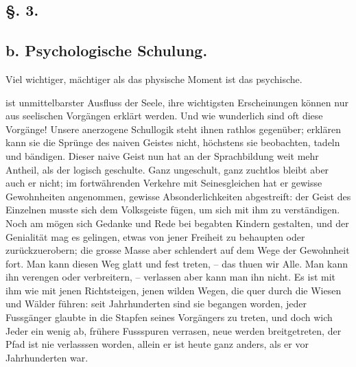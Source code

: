 \subsection*{§. 3.}\label{I.V.3}
\subsection*{b. Psychologische Schulung.}

Viel wichtiger, mächtiger als das physische Moment ist das psychische. 

 ist unmittelbarster Ausfluss der Seele, ihre wichtigsten Erscheinungen können nur aus seelischen Vorgängen erklärt werden. Und wie wunderlich sind oft diese Vorgänge! Unsere anerzogene Schullogik steht ihnen rathlos gegenüber; erklären kann sie die Sprünge des naiven Geistes nicht, höchstens sie beobachten, tadeln und bändigen. Dieser naive Geist nun hat an der Sprachbildung weit mehr Antheil, als der logisch geschulte. Ganz ungeschult, ganz zuchtlos bleibt aber auch er nicht; im fortwährenden Verkehre mit Seinesgleichen hat er gewisse Gewohnheiten angenommen, gewisse Absonderlichkeiten abgestreift: der Geist des Einzelnen musste sich dem Volksgeiste fügen, \label{sp.40} um sich mit ihm zu verständigen. Noch am  mögen sich Gedanke und Rede bei begabten Kindern gestalten, und der Genialität mag es gelingen, etwas von jener Freiheit zu behaupten oder zurückzuerobern; die grosse Masse aber schlendert auf dem Wege der Gewohnheit fort. Man kann diesen Weg glatt und fest treten, – das thuen wir Alle. Man kann ihn verengen oder verbreitern, – verlassen aber kann man ihn nicht. Es ist mit ihm wie mit jenen Richtsteigen, jenen wilden Wegen, die quer durch die Wiesen und Wälder führen: seit Jahrhunderten sind sie begangen worden, jeder Fussgänger glaubte in die Stapfen seines Vorgängers zu treten, und doch wich Jeder ein wenig ab, frühere Fussspuren verrasen, neue werden breitgetreten, der Pfad ist nie verlasssen worden, allein er ist heute ganz anders, als er vor Jahrhunderten war.

